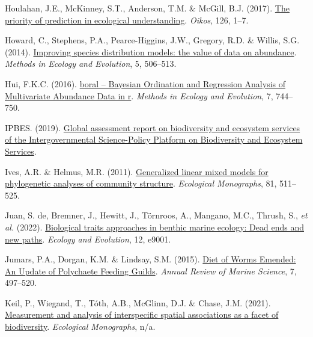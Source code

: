 \documentclass[9pt,biorxiv,doublespacing,lineno]{lapreprint}
\newlength{\cslhangindent}
\newlength{\cslentryspacingunit} %
\newenvironment{CSLReferences}[2] %
 {%
  \setlength{\parindent}{0pt}
  \ifodd #1
  \let\oldpar\par
  \def\par{\hangindent=\cslhangindent\oldpar}
  \fi
  \setlength{\parskip}{#2\cslentryspacingunit}
 }%
 {}
\begin{document}
\begin{CSLReferences}{1}{0}
\leavevmode{}%
Houlahan, J.E., McKinney, S.T., Anderson, T.M. \& McGill, B.J. (2017).
\href{https://doi.org/10.1111/oik.03726}{The priority of prediction in
ecological understanding}. \emph{Oikos}, 126, 1--7.

\leavevmode{}%
Howard, C., Stephens, P.A., Pearce-Higgins, J.W., Gregory, R.D. \&
Willis, S.G. (2014).
\href{https://doi.org/10.1111/2041-210X.12184}{Improving species
distribution models: the value of data on abundance}. \emph{Methods in
Ecology and Evolution}, 5, 506--513.

\leavevmode{}%
Hui, F.K.C. (2016). \href{https://doi.org/10.1111/2041-210X.12514}{boral
-- Bayesian Ordination and Regression Analysis of Multivariate Abundance
Data in r}. \emph{Methods in Ecology and Evolution}, 7, 744--750.

\leavevmode{}%
IPBES. (2019). \href{https://doi.org/10.5281/zenodo.6417333}{Global
assessment report on biodiversity and ecosystem services of the
Intergovernmental Science-Policy Platform on Biodiversity and Ecosystem
Services}.

\leavevmode{}%
Ives, A.R. \& Helmus, M.R. (2011).
\href{https://doi.org/10.1890/10-1264.1}{Generalized linear mixed models
for phylogenetic analyses of community structure}. \emph{Ecological
Monographs}, 81, 511--525.

\leavevmode{}%
Juan, S. de, Bremner, J., Hewitt, J., Törnroos, A., Mangano, M.C.,
Thrush, S., \emph{et al.} (2022).
\href{https://doi.org/10.1002/ece3.9001}{Biological traits approaches in
benthic marine ecology: Dead ends and new paths}. \emph{Ecology and
Evolution}, 12, e9001.

\leavevmode{}%
Jumars, P.A., Dorgan, K.M. \& Lindsay, S.M. (2015).
\href{https://doi.org/10.1146/annurev-marine-010814-020007}{Diet of
Worms Emended: An Update of Polychaete Feeding Guilds}. \emph{Annual
Review of Marine Science}, 7, 497--520.

\leavevmode{}%
Keil, P., Wiegand, T., Tóth, A.B., McGlinn, D.J. \& Chase, J.M. (2021).
\href{https://doi.org/10.1002/ecm.1452}{Measurement and analysis of
interspecific spatial associations as a facet of biodiversity}.
\emph{Ecological Monographs}, n/a.


\end{CSLReferences}
\end{document}
